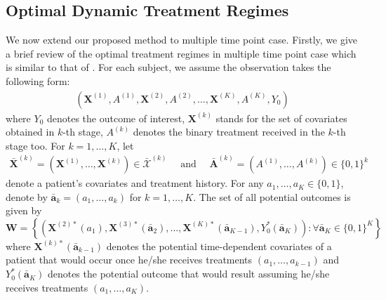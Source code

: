 \documentclass[11pt]{article}
\theoremstyle{referenceplain}
\theoremstyle{referencedefinition}
\theoremstyle{referenceremark}
\begin{document}
\subsection{Optimal Dynamic Treatment Regimes}\label{appB1}
We now extend our proposed method to multiple time point case. Firstly, we give a brief review of the optimal treatment regimes in multiple time point case which is similar to that of \citet{shi2020breaking}. For each subject, we assume the observation takes the following form:
\begin{align*}
    \left(\mathbf{X}^{(1)}, A^{(1)}, \mathbf{X}^{(2)}, A^{(2)}, \ldots, \mathbf{X}^{(K)}, A^{(K)}, Y_0\right)
\end{align*}
where $Y_0$ denotes the outcome of interest, $\mathbf{X}^{(k)}$ stands for the set of covariates obtained in $k$-th stage, $A^{(k)}$ denotes the binary treatment received in the $k$-th stage too. For $k=1, \ldots, K$, let 
\begin{align*}
    \bar{\mathbf{X}}^{(k)}=\left(\mathbf{X}^{(1)}, \ldots, \mathbf{X}^{(k)}\right) \in \bar{\mathcal{X}}^{(k)} \quad \text { and } \quad \bar{\mathbf{A}}^{(k)}=\left(A^{(1)}, \ldots, A^{(k)}\right) \in\{0,1\}^k
\end{align*}
denote a patient's covariates and treatment history. For any $a_1, \ldots, a_K \in\{0,1\}$, denote by $\bar{\mathbf{a}}_k=\left(a_1, \ldots, a_k\right)$ for $k=1, \ldots, K$. The set of all potential outcomes is given by
$$
\mathbf{W}=\left\{\left(\mathbf{X}^{(2) *}\left(a_1\right), \mathbf{X}^{(3) *}\left(\bar{\mathbf{a}}_2\right), \ldots, \mathbf{X}^{(K) *}\left(\bar{\mathbf{a}}_{K-1}\right), Y_0^*\left(\bar{\mathbf{a}}_K\right)\right): \forall \bar{\mathbf{a}}_K \in\{0,1\}^K\right\}
$$
where $\mathbf{X}^{(k) *}\left(\bar{\mathbf{a}}_{k-1}\right)$ denotes the potential time-dependent covariates of a patient that would occur once he/she receives treatments $\left(a_1, \ldots, a_{k-1}\right)$  and $Y_0^*\left(\bar{\mathbf{a}}_K\right)$ denotes the potential outcome that would result assuming he/she receives treatments $\left(a_1, \ldots, a_K\right)$. 
\end{document}

